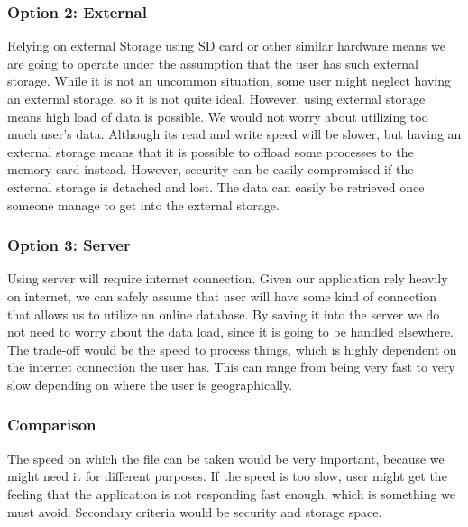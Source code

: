 \documentclass[journal,compsoc, 10pt, draftclsnofoot, onecolumn]{IEEEtran}
\begin{document}
\subsubsection*{Option 2: External}
Relying on external Storage using SD card or other similar hardware means we are going to operate under the assumption that the user has such external storage. While it is not an uncommon situation, some user might neglect having an external storage, so it is not quite ideal. However, using external storage means high load of data is possible. We would not worry about utilizing too much user's data. Although its read and write speed will be slower, but having an external storage means that it is possible to offload some processes to the memory card instead. However, security can be easily compromised if the external storage is detached and lost. The data can easily be retrieved once someone manage to get into the external storage.

\subsubsection*{Option 3: Server}
Using server will require internet connection. Given our application rely heavily on internet, we can safely assume that user will have some kind of connection that allows us to utilize an online database. By saving it into the server we do not need to worry about the data load, since it is going to be handled elsewhere. The trade-off would be the speed to process things, which is highly dependent on the internet connection the user has. This can range from being very fast to very slow depending on where the user is geographically.  

\subsubsection{Comparison}
The speed on which the file can be taken would be very important, because we might need it for different purposes. If the speed is too slow, user might get the feeling that the application is not responding fast enough, which is something we must avoid. Secondary criteria would be security and storage space.
\end{document}
